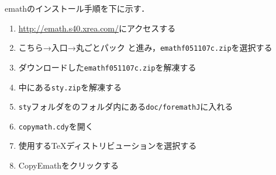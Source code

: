 emathのインストール手順を下に示す．
\begin{enumerate}
    \item \url{http://emath.s40.xrea.com/}にアクセスする
    \item こちら→入口→丸ごとパック と進み，\verb|emathf051107c.zip|を選択する
    \item ダウンロードした\verb|emathf051107c.zip|を解凍する
    \item 中にある\verb|sty.zip|を解凍する
    \item \verb|sty|フォルダを{\ketcindy}のフォルダ内にある\verb|doc/foremathJ|に入れる
    \item \verb|copymath.cdy|を開く
    \item 使用する{\TeX}ディストリビューションを選択する
    \item CopyEmathをクリックする
\end{enumerate}

